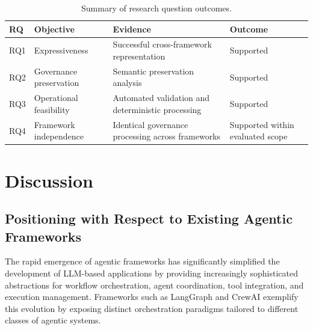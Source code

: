 \documentclass[10pt]{article}
\begin{document}
\begin{table}[ht]

\centering

\caption{Summary of research question outcomes.}

\label{tab:rq_summary}

\begin{tabular}{p{1cm}p{2.7cm}p{5cm}p{2cm}}

\toprule

\textbf{RQ} &
\textbf{Objective} &
\textbf{Evidence} &
\textbf{Outcome}

\\

\midrule

RQ1 &
Expressiveness &
Successful cross-framework representation &
Supported

\\

RQ2 &
Governance preservation &
Semantic preservation analysis &
Supported

\\

RQ3 &
Operational feasibility &
Automated validation and deterministic processing &
Supported

\\

RQ4 &
Framework independence &
Identical governance processing across frameworks &
Supported within evaluated scope

\\

\bottomrule

\end{tabular}

\end{table}

\section{Discussion}
\label{sec:discussion}
\subsection{Positioning with Respect to Existing Agentic Frameworks}
\label{sec:positioning}

The rapid emergence of agentic frameworks has significantly simplified the development of LLM-based applications by providing increasingly sophisticated abstractions for workflow orchestration, agent coordination, tool integration, and execution management. Frameworks such as LangGraph and CrewAI exemplify this evolution by exposing distinct orchestration paradigms tailored to different classes of agentic systems.
\end{document}
